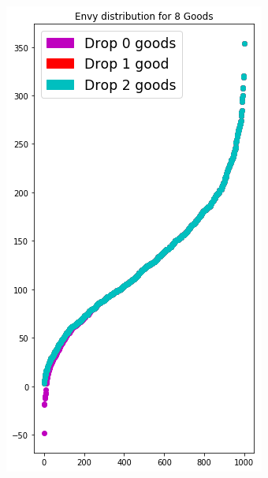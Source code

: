 \begin{figure}[h!]
\begin{subfigure}[b]{0.47\linewidth}
    \caption{}
  \end{subfigure}
  \begin{subfigure}[b]{0.47\linewidth}
    \includegraphics[width=\linewidth]{images/envy_density/envy_density_u8.png}
    \caption{}
  \end{subfigure}
  \begin{subfigure}[b]{0.47\linewidth}

\end{subfigure}
\end{figure}
